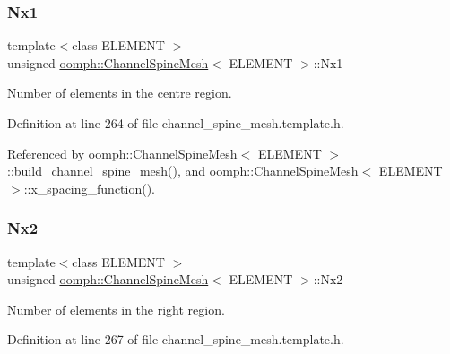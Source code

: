 \mbox{\label{classoomph_1_1ChannelSpineMesh_a678cfaebcb1c7a31027188af36be9e7b}} 
\subsubsection{\texorpdfstring{Nx1}{Nx1}}
{\footnotesize\ttfamily template$<$class E\+L\+E\+M\+E\+NT $>$ \\
unsigned \hyperlink{classoomph_1_1ChannelSpineMesh}{oomph\+::\+Channel\+Spine\+Mesh}$<$ E\+L\+E\+M\+E\+NT $>$\+::Nx1\hspace{0.3cm}{\ttfamily [protected]}}



Number of elements in the centre region. 



Definition at line 264 of file channel\+\_\+spine\+\_\+mesh.\+template.\+h.



Referenced by oomph\+::\+Channel\+Spine\+Mesh$<$ E\+L\+E\+M\+E\+N\+T $>$\+::build\+\_\+channel\+\_\+spine\+\_\+mesh(), and oomph\+::\+Channel\+Spine\+Mesh$<$ E\+L\+E\+M\+E\+N\+T $>$\+::x\+\_\+spacing\+\_\+function().

\mbox{\label{classoomph_1_1ChannelSpineMesh_a46534250de6f75890463bfddefdb39cd}} 
\subsubsection{\texorpdfstring{Nx2}{Nx2}}
{\footnotesize\ttfamily template$<$class E\+L\+E\+M\+E\+NT $>$ \\
unsigned \hyperlink{classoomph_1_1ChannelSpineMesh}{oomph\+::\+Channel\+Spine\+Mesh}$<$ E\+L\+E\+M\+E\+NT $>$\+::Nx2\hspace{0.3cm}{\ttfamily [protected]}}



Number of elements in the right region. 



Definition at line 267 of file channel\+\_\+spine\+\_\+mesh.\+template.\+h.



